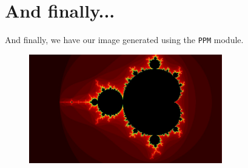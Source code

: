 \pagebreak
\section{And finally...}
And finally, we have our image generated using the \texttt{PPM} module.

\begin{figure}[h!]
    \centering
    \includegraphics[width=0.75\textwidth]{img/sm}
\end{figure}